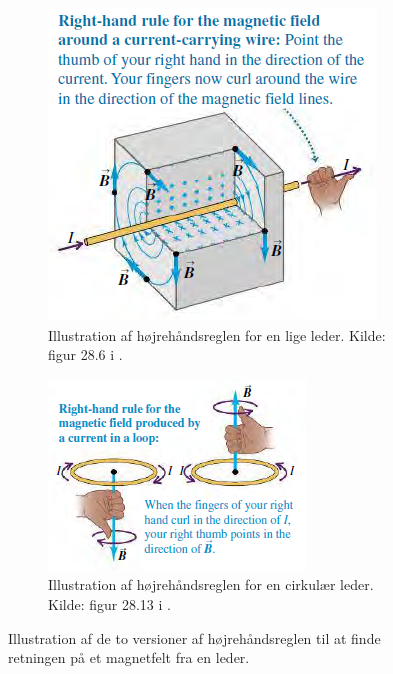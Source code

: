 \begin{figure}
    \centering
    \begin{subfigure}[t]{.47\textwidth}
        \includegraphics[width=\columnwidth]{Elektro/Figurer/right_hand_rule.PNG}
        \caption{Illustration af højrehåndsreglen for en lige leder. Kilde: figur 28.6 i \cite{youngSearsZemanskyUniversity2016}.}
        \label{fig:right_hand_rule_el}
    \end{subfigure}
    \hfill
    \begin{subfigure}[t]{.47\textwidth}
        \includegraphics[width=\columnwidth]{Elektro/Figurer/right_hand_rule_loop.PNG}
        \caption{Illustration af højrehåndsreglen for en cirkulær leder. Kilde: figur 28.13 i \cite{youngSearsZemanskyUniversity2016}.}
        \label{fig:right_hand_rule_el_loop}
    \end{subfigure}
    \caption{Illustration af de to versioner af højrehåndsreglen til at finde retningen på et magnetfelt fra en leder.}
    \label{fig:right_hand_rule_both}
\end{figure}

